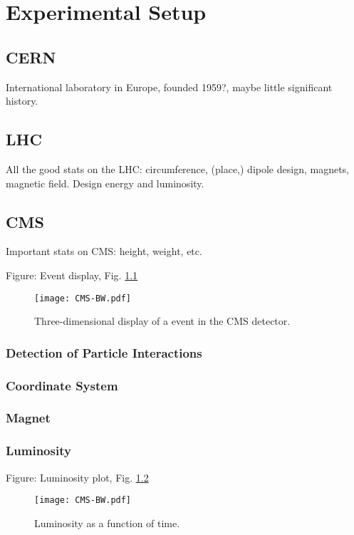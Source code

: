 \chapter{Experimental Setup}
\section{CERN}
International laboratory in Europe, founded 1959?, maybe little significant history.  

\section{LHC}
All the good stats on the LHC: circumference, (place,) dipole design, magnets, magnetic field.  Design energy and luminosity.  

\section{CMS}
Important stats on CMS: height, weight, etc.  

Figure: Event display, Fig. \ref{fig:EventDisplay}

 \begin{figure}[htb]
  \begin{center}
    \texttt{[image: CMS-BW.pdf]}
  \end{center}
  \caption[Three-dimensional display of a \Zee event in the CMS detector]{Three-dimensional display of a \Zee event in the CMS detector.}
  \label{fig:EventDisplay}
 \end{figure}

\subsection{Detection of Particle Interactions}
\subsection{Coordinate System}
\subsection{Magnet}
\subsection{Luminosity}
Figure: Luminosity plot, Fig. \ref{fig:LuminosityVsTime}

 \begin{figure}[htb]
  \begin{center}
    \texttt{[image: CMS-BW.pdf]}
  \end{center}
  \caption[Luminosity as a function of time]{Luminosity as a function of time.}
  \label{fig:LuminosityVsTime}
 \end{figure}

